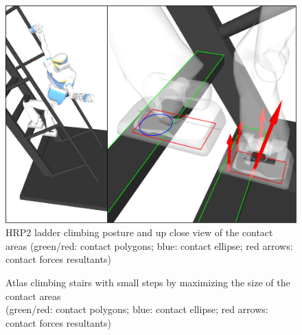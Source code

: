 
\begin{figure}[htpb]
  \centering
  \includegraphics[width=0.8\linewidth]{hrp2_inclined_ladder.pdf}
  \caption{HRP2 ladder climbing posture and up close view of the contact areas (green/red: contact polygons; blue: contact ellipse; red arrows: contact forces resultants)}
\label{fig:hrp2_darpa_complete}
\end{figure}

\begin{figure}
\centering
\setlength\fboxsep{0pt}
\setlength\fboxrule{1pt}
\caption{Atlas climbing stairs with small steps by maximizing the size of the contact areas\\(green/red: contact polygons; blue: contact ellipse; red arrows: contact forces resultants)}
\label{fig:atlas_SmallStairs}
\end{figure}



